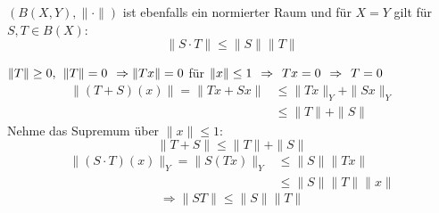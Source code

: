 \begin{satz}
 	$(B(X, Y), \| \cdot \|)$ ist ebenfalls ein normierter Raum und für $X = Y$ gilt für $S, T \in B(X)$:
 	\[ \| S \cdotp T \| \leq \| S \| \| T \| \]
\end{satz}
\begin{beweis}
	$\| T \| \geq 0, \hspace{0.15cm} \| T \| = 0 \hspace{0.15cm} \Rightarrow \| Tx \| = 0$ für $\| x \| \leq 1 \hspace{0.15cm} \Rightarrow \hspace{0.15cm} Tx = 0 \hspace{0.15cm} \Rightarrow \hspace{0.15cm} T = 0$ \\
	\begin{align*}
		\| ( T + S )(x) \| = \| Tx + Sx \| &\leq \| Tx \|_{Y} + \| Sx \|_{Y} \\
										   &\leq \| T \| + \| S \|
	\end{align*}
	Nehme das Supremum über $\| x \| \leq 1$:
	\[ \| T + S \| \leq \| T \| + \| S \| \]
	\begin{align*}
		\| ( S \cdot T )(x) \|_{Y} = \| S(Tx) \|_{Y} & \leq \| S \| \| Tx \| \\
													 & \leq \| S \| \| T \| \| x \|
	\end{align*}
	\[ \Rightarrow \| S T \| \leq \| S \| \| T \| \]
\end{beweis}


